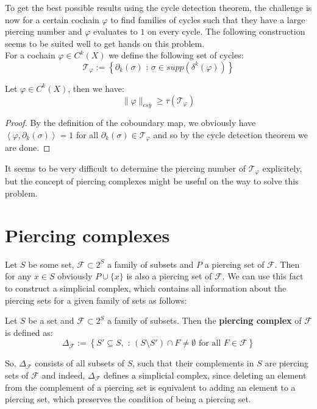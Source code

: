 To get the best possible results using the cycle detection theorem, the challenge is now for a certain cochain \(\varphi\) to find families of cycles such that they have a large piercing number and \(\varphi\) evaluates to \(1\) on every cycle. The following construction seems to be suited well to get hands on this problem.\\
For a cochain \(\varphi\in C^k(X)\) we define the following set of cycles:
\[
\mathcal{T}_{\varphi}:=\left\{\partial_k(\sigma)\text{ : }\sigma\in supp(\delta^k(\varphi))\right\}
\]

\begin{prop}
Let \(\varphi\in C^k(X)\), then we have:
\[
\|\varphi\|_{csy}\geq\tau(\mathcal{T}_{\varphi})
\]
\begin{proof}
By the definition of the coboundary map, we obviously have\\
\(\left\langle\varphi,\partial_k(\sigma)\right\rangle=1\) for all \(\partial_k(\sigma)\in\mathcal{T}_{\varphi}\) and so by the cycle detection theorem we are done.
\end{proof}
\end{prop}

It seems to be very difficult to determine the piercing number of \(\mathcal{T}_{\varphi}\) explicitely, but the concept of piercing complexes might be useful on the way to solve this problem.

\section{Piercing complexes}

Let \(S\) be some set, \(\mathcal{F}\subset 2^S\) a family of subsets and \(P\) a piercing set of \(\mathcal{F}\). Then for any \(x\in S\) obviously \(P\cup\{x\}\) is also a piercing set of \(\mathcal{F}\). We can use this fact to construct a simplicial complex, which contains all information about the piercing sets for a given family of sets as follows:

\begin{defi}
Let \(S\) be a set and \(\mathcal{F}\subset 2^S\) a family of subsets. Then the \textbf{piercing complex} of \(\mathcal{F}\) is defined as:
\[
\Delta_{\mathcal{F}}:=\left\{S'\subseteq S,\text{ : }(S\setminus S')\cap F\neq\emptyset\text{ for all }F\in\mathcal{F}\right\}
\]
\end{defi}
So, \(\Delta_{\mathcal{F}}\) consists of all subsets of \(S\), such that their complements in \(S\) are piercing sets of \(\mathcal{F}\) and indeed, \(\Delta_{\mathcal{F}}\) defines a simplicial complex, since deleting an element from the complement of a piercing set is equivalent to adding an element to a piercing set, which preserves the condition of being a piercing set.\\

